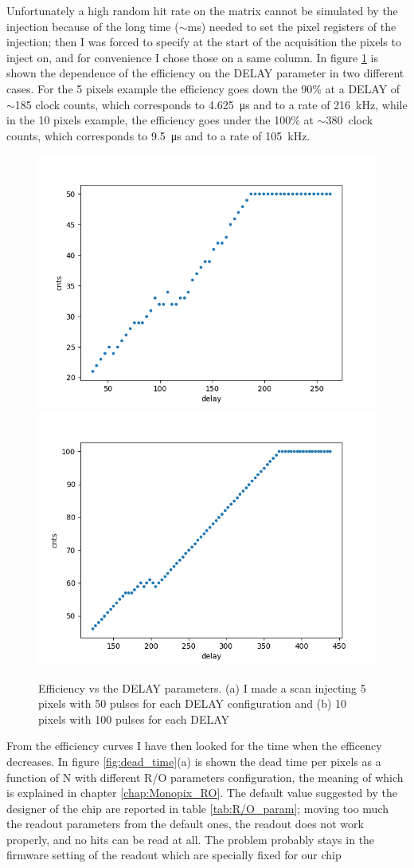         Unfortunately a high random hit rate on the matrix cannot be simulated by the injection because of the long time ($\sim$\si{ms}) needed to set the pixel registers of the injection; then I was forced to specify at the start of the acquisition the pixels to inject on, and for convenience I chose those on a same column.  
        In figure \ref{fig:efficiency_VS_delay} is shown the dependence of the efficiency on the DELAY parameter in two different cases. 
        For the 5 pixels example the efficiency goes down the 90\% at a DELAY of $\sim$185 clock counts, which corresponds to \SI{4.625}{\us} and to a rate of \SI{216}{kHz}, while in the 10 pixels example, the efficiency goes under the 100\% at $\sim$\SI{380}{clock} counts, which corresponds to \SI{9.5}{\us} and to a rate of \SI{105}{kHz}. 
        \begin{figure}[h!]
            \includegraphics[width=.49\linewidth]{figures/charaterization/efficiency_5pixels.png}
            \centering
            \includegraphics[width=.49\linewidth]{figures/charaterization/efficiency_10pixels.png}
            \caption{Efficiency vs the DELAY parameters. (a) I made a scan injecting 5 pixels with 50 pulses for each DELAY configuration and (b) 10 pixels with 100 pulses for each DELAY}
            \label{fig:efficiency_VS_delay}
        \end{figure}
        From the efficiency curves I have then looked for the time when the efficency decreases. In figure \ref{fig:dead_time}(a) is shown the dead time per pixels as a function of N with different R/O parameters configuration, the meaning of which is explained in chapter \ref{chap:Monopix_RO}. The default value suggested by the designer of the chip are reported in table \ref{tab:R/O_param}; moving too much the readout parameters from the default ones, the readout does not work properly, and no hits can be read at all. The problem probably stays in the firmware setting of the readout which are specially fixed for our chip 
